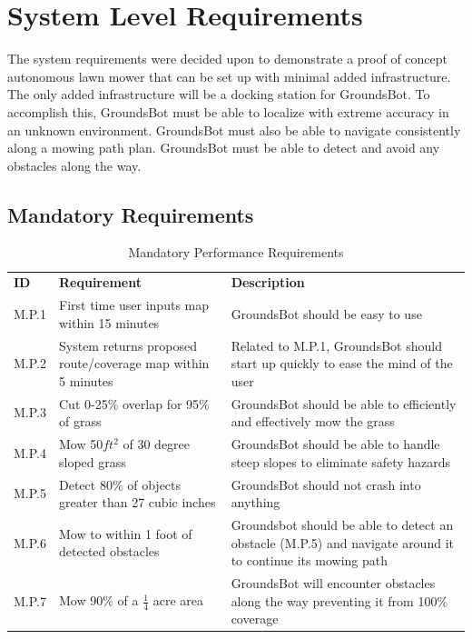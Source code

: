 \documentclass{article}
\begin{document}
\section{System Level Requirements}

The system requirements were decided upon to demonstrate a proof of concept autonomous lawn mower that can be set up with minimal added infrastructure. The only added infrastructure will be a docking station for GroundsBot. To accomplish this, GroundsBot must be able to localize with extreme accuracy in an unknown environment. GroundsBot must also be able to navigate consistently along a mowing path plan. GroundsBot must be able to detect and avoid any obstacles along the way.

\subsection{Mandatory Requirements}
\begin{center}
  \begin{table}[H]
  \caption{Mandatory Performance Requirements}
  \label{table:mandatory performance}
  \def\arraystretch{1.5}
  	\begin{tabularx}{\textwidth}{ lXX }
  	  	\hline
		\textbf{ID} & \textbf{Requirement} & \textbf{Description} \\
    	M.P.1 &
    	First time user inputs map within 15 minutes &
    	GroundsBot should be easy to use \\
   		M.P.2 &
   		System returns proposed route/coverage map within 5 minutes &
   		Related to M.P.1, GroundsBot should start up quickly to ease the mind of the user \\
   		M.P.3 &
   		Cut 0-25\% overlap for 95\% of grass &
   		GroundsBot should be able to efficiently and effectively mow the grass \\
		M.P.4 &
		Mow 50$ft^2$ of 30 degree sloped grass &
		GroundsBot should be able to handle steep slopes to eliminate safety hazards \\
		M.P.5 &
		Detect 80\% of objects greater than 27 cubic inches &
		GroundsBot should not crash into anything \\
		M.P.6 &
		Mow to within 1 foot of detected obstacles &
		Groundsbot should be able to detect an obstacle (M.P.5) and navigate around it to continue its mowing path \\
		M.P.7 &
		Mow 90\% of a $\frac{1}{4}$ acre area &
		GroundsBot will encounter obstacles along the way preventing it from 100\% coverage \\
	\end{tabularx}
  \end{table}
\end{center}
\end{document}
